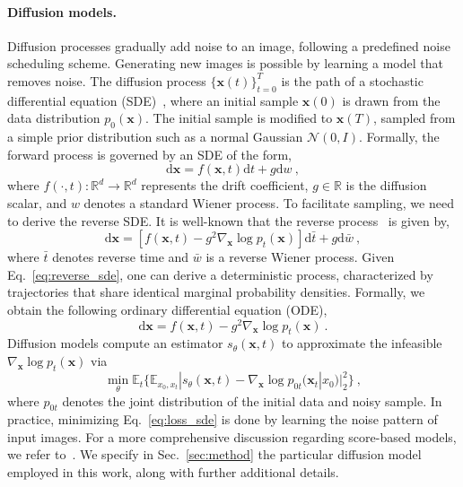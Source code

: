\documentclass{article}
\begin{document}
\paragraph{Diffusion models.} Diffusion processes gradually add noise to an image, following a predefined noise scheduling scheme. Generating new images is possible by learning a model that removes noise. The diffusion process $\{\mathbf{x}(t)\}_{t=0}^T$ is the path of a stochastic differential equation (SDE)~\cite{song2021scorebased}, where an initial sample $\mathbf{x}(0)$ is drawn from the data distribution $p_0( \mathbf{x})$. The initial sample is modified to $\mathbf{x}(T)$, sampled from a simple prior distribution such as a normal Gaussian $\mathcal{N}(0, I)$. Formally, the forward process is governed by an SDE of the form,
\begin{equation}
    \mathrm{d}\mathbf{x} = f(\mathbf{x}, t) \mathrm{d}t + g \mathrm{d}w \ ,
\end{equation}
where $f(\cdot, t):\mathbb{R}^d \rightarrow \mathbb{R}^d$ represents the drift coefficient, $g \in \mathbb{R}$ is the diffusion scalar, and $w$ denotes a standard Wiener process. To facilitate sampling, we need to derive the reverse SDE. It is well-known that the reverse process~\cite{anderson1982reverse} is given by,
\begin{equation}
    \label{eq:reverse_sde}
    \mathrm{d}\mathbf{x} = [f(\mathbf{x}, t) - g^2 \nabla_\mathbf{x} \log p_t(\mathbf{x})] \mathrm{d}\bar{t} + g \mathrm{d}\bar{w} \ ,
\end{equation}
where $\bar{t}$ denotes reverse time and $\bar{w}$ is a reverse Wiener process. Given Eq.~\eqref{eq:reverse_sde}, one can derive a deterministic process, characterized by trajectories that share identical marginal probability densities. Formally, we obtain the following ordinary differential equation (ODE),
\begin{equation}
    \label{eq:reverse_ode}
    \mathrm{d}\mathbf{x} = f(\mathbf{x}, t) - g^2 \nabla_\mathbf{x} \log p_t(\mathbf{x}) \ .
\end{equation}
Diffusion models compute an estimator $s_\theta(\mathbf{x}, t)$ to approximate the infeasible $\nabla_\mathbf{x} \log p_t(\mathbf{x})$ via
\begin{equation} \label{eq:loss_sde}
    \min_\theta \mathbb{E}_t \{ \mathbb{E}_{x_0, x_t} | s_\theta(\mathbf{x}, t) - \nabla_\mathbf{x} \log p_{0t} (\mathbf{x}_t | x_0) |^2_2 \} \ ,
\end{equation}
where $p_{0t}$ denotes the joint distribution of the initial data and noisy sample. In practice, minimizing Eq.~\eqref{eq:loss_sde} is done by learning the noise pattern of input images. For a more comprehensive discussion regarding score-based models, we refer to~\cite{song2021scorebased, karras2022elucidating}. We specify in Sec.~\ref{sec:method} the particular diffusion model employed in this work, along with further additional details.
\end{document}
